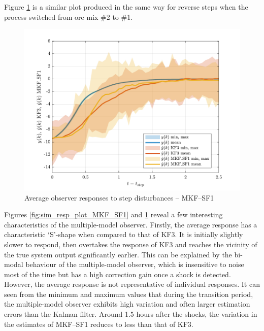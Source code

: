 Figure \ref{fig:sim_resp_plot2_MKF_SF1} is a similar plot produced in the same way for reverse steps when the process switched from ore mix \#2 to \#1.
\begin{figure}[htp]
	\centering
	\includegraphics[width=13cm]{images/grind1_rod_obs_sim_resp_plot2_MKF_SF1.pdf}
	\caption{Average observer responses to step disturbances -- MKF--SF1}
	\label{fig:sim_resp_plot2_MKF_SF1}
\end{figure}

Figures \ref{fig:sim_resp_plot_MKF_SF1} and \ref{fig:sim_resp_plot2_MKF_SF1} reveal a few interesting characteristics of the multiple-model observer. Firstly, the average response has a characteristic `S'-shape when compared to that of KF3. It is initially slightly slower to respond, then overtakes the response of KF3 and reaches the vicinity of the true system output significantly earlier. This can be explained by the bi-modal behaviour of the multiple-model observer, which is insensitive to noise most of the time but has a high correction gain once a shock is detected. However, the average response is not representative of individual responses. It can seen from the minimum and maximum values that during the transition period, the multiple-model observer exhibits high variation and often larger estimation errors than the Kalman filter. Around 1.5 hours after the shocks, the variation in the estimates of MKF--SF1 reduces to less than that of KF3.

